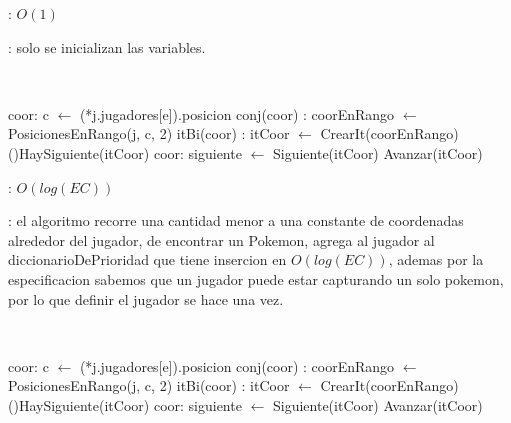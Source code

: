 \begin{Algoritmos}
	\complejidad: $O(1)$

	\justifcomp: solo se inicializan las variables.

	~

	\begin{algorithm}[H]
		\NoCaptionOfAlgo
		\caption{}
		\BlankLine
		coor: c $\leftarrow$ (*j.jugadores[e]).posicion
		conj(coor) : coorEnRango $\leftarrow$ PosicionesEnRango(j, c, 2)
		itBi(coor) : itCoor $\leftarrow$ CrearIt(coorEnRango)
		\While(){HaySiguiente(itCoor)}{
			coor: siguiente $\leftarrow$ Siguiente(itCoor)
			Avanzar(itCoor)
		}
	\end{algorithm}

	\complejidad: $O(log(EC))$

	\justifcomp: el algoritmo recorre una cantidad menor a una constante de coordenadas alrededor del jugador, de encontrar un Pokemon, agrega al jugador al diccionarioDePrioridad que tiene insercion en $O(log(EC))$, ademas por la especificacion sabemos que un jugador puede estar capturando un solo pokemon, por lo que definir el jugador se hace una vez.

	~

	\begin{algorithm}[H]
		\NoCaptionOfAlgo
		\caption{}
		\BlankLine
		coor: c $\leftarrow$ (*j.jugadores[e]).posicion
		conj(coor) : coorEnRango $\leftarrow$ PosicionesEnRango(j, c, 2)
		itBi(coor) : itCoor $\leftarrow$ CrearIt(coorEnRango)
		\While(){HaySiguiente(itCoor)}{
			coor: siguiente $\leftarrow$ Siguiente(itCoor)
			Avanzar(itCoor)
		}
	\end{algorithm}


\end{Algoritmos}
